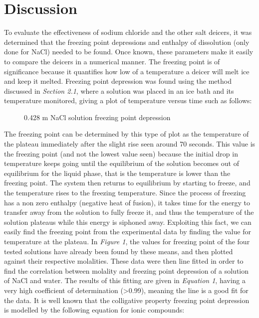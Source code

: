 \documentclass[12pt, letterpaper]{article}
\begin{document}
\section{Discussion}\doublespacing
To evaluate the effectiveness of sodium chloride and the other salt deicers, it was determined that the freezing point depressions and enthalpy of dissolution (only done for NaCl) needed to be found. Once known, these parameters make it easily to compare the deicers in a numerical manner. The freezing point is of significance because it quantifies how low of a temperature a deicer will melt ice and keep it melted. Freezing point depression was found using the method discussed in \textit{Section 2.1}, where a solution was placed in an ice bath and its temperature monitored, giving a plot of temperature versus time such as follows:
\begin{figure}[h!]
  \begin{center}
    	\resizebox{0.6\textwidth}{!}{}
  \end	{center}
  \caption{0.428 m NaCl solution freezing point depression}
\end {figure}
\FloatBarrier
The freezing point can be determined by this type of plot as the temperature of the plateau immediately after the slight rise seen around 70 seconds. This value is the freezing point (and not the lowest value seen) because the initial drop in temperature keeps going until the equilibrium of the solution becomes out of equilibrium for the liquid phase, that is the temperature is lower than the freezing point. The system then returns to equilibrium by starting to freeze, and the temperature rises to the freezing temperature. Since the process of freezing has a non zero enthalpy (negative heat of fusion), it takes time for the energy to transfer away from the solution to fully freeze it, and thus the temperature of the solution plateaus while this energy is siphoned away. Exploiting this fact, we can easily find the freezing point from the experimental data by finding the value for temperature at the plateau. In \textit{Figure 1}, the values for freezing point of the four tested solutions have already been found by these means, and then plotted against their respective molalities. These data were then line fitted in order to find the correlation between molality and freezing point depression of a solution of NaCl and water. The results of this fitting are given in \textit{Equation 1}, having a very high coefficient of determination (\textgreater 0.99), meaning the line is a good fit for the data. It is well known that the colligative property freezing point depression is modelled by the following equation for ionic compounds:
\end{document}
